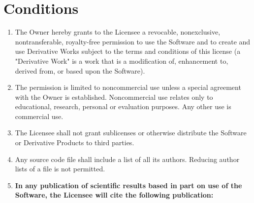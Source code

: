 \section{Conditions}
\begin{enumerate}
	\item The Owner hereby grants to the Licensee a revocable, nonexclusive, nontransferable, royalty-free permission to use the Software and to create and use Derivative Works subject to the terms and conditions of this license (a "Derivative Work" is a work that is a modification of, enhancement to, derived from, or based upon the Software).
	\item The permission is limited to noncommercial use unless a special agreement with the Owner is established. Noncommercial use relates only to educational, research, personal or evaluation purposes. Any other use is commercial use.
	\item The Licensee shall not grant sublicenses or otherwise distribute the Software or Derivative Products to third parties.
	\item Any source code file shall include a list of all its authors. Reducing author lists of a file is not permitted.
	\item \textbf{In any publication of scientific results based in part on use of the Software, the Licensee will cite the following publication:}


\end{enumerate}
